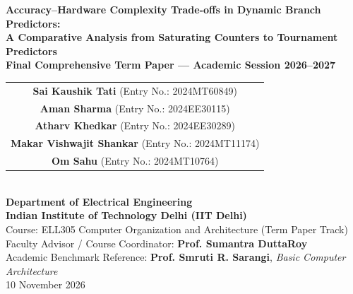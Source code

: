 \documentclass[11pt,a4paper]{article}
\begin{document}
\begin{titlepage}
\centering
\vspace*{1.0cm}

{\Huge \textbf{Accuracy--Hardware Complexity Trade-offs in Dynamic Branch Predictors:}}\\[0.8em]
{\LARGE \textbf{A Comparative Analysis from Saturating Counters to Tournament Predictors}}\\[1.5em]

{\large \textbf{Final Comprehensive Term Paper --- Academic Session 2026--2027}}\\[1.8cm]

{\large
\begin{tabular}{c}
\textbf{Sai Kaushik Tati} \quad (Entry No.: 2024MT60849) \\[0.8em]
\textbf{Aman Sharma} \quad (Entry No.: 2024EE30115) \\[0.8em]
\textbf{Atharv Khedkar} \quad (Entry No.: 2024EE30289) \\[0.8em]
\textbf{Makar Vishwajit Shankar} \quad (Entry No.: 2024MT11174) \\[0.8em]
\textbf{Om Sahu} \quad (Entry No.: 2024MT10764)
\end{tabular}
}\\[1.8cm]

{\large \textbf{Department of Electrical Engineering}}\\[0.3em]
{\Large \textbf{Indian Institute of Technology Delhi (IIT Delhi)}}\\[1.0em]
{\normalsize Course: ELL305 Computer Organization and Architecture (Term Paper Track)}\\[0.3em]
{\normalsize Faculty Advisor / Course Coordinator: \textbf{Prof. Sumantra DuttaRoy}}\\[0.3em]
{\normalsize Academic Benchmark Reference: \textbf{Prof. Smruti R. Sarangi}, \textit{Basic Computer Architecture}}\\[1.5cm]

{\large 10 November 2026}

\vfill
\end{titlepage}

\setcounter{page}{2}

\end{document}
